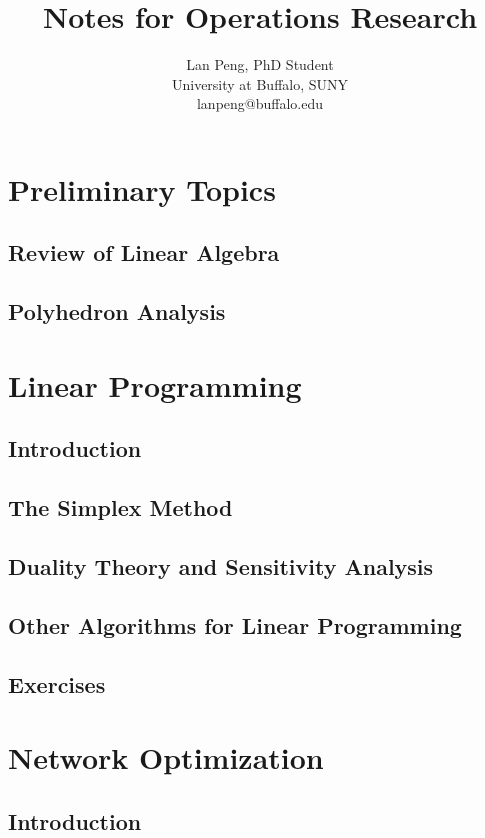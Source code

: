 \documentclass[10pt, twocolumn]{book}
\author{Lan Peng, PhD Student\\University at Buffalo, SUNY\\lanpeng@buffalo.edu}
\title{Notes for Operations Research}
\begin{document}
\maketitle
\tableofcontents

\part{Preliminary Topics}
	\chapter{Review of Linear Algebra}

	\chapter{Polyhedron Analysis}
	
\part{Linear Programming}
	\chapter{Introduction}

	\chapter{The Simplex Method}

	\chapter{Duality Theory and Sensitivity Analysis}

	\chapter{Other Algorithms for Linear Programming}

	\chapter{Exercises}

\part{Network Optimization}
	\chapter{Introduction}
\end{document}
